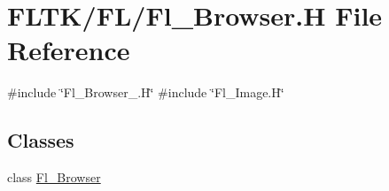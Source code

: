 \hypertarget{_fl___browser_8_h}{}\section{F\+L\+T\+K/\+F\+L/\+Fl\+\_\+\+Browser.H File Reference}
\label{_fl___browser_8_h}
{\ttfamily \#include \char`\"{}Fl\+\_\+\+Browser\+\_\+.\+H\char`\"{}}\newline
{\ttfamily \#include \char`\"{}Fl\+\_\+\+Image.\+H\char`\"{}}\newline
\subsection*{Classes}
\begin{DoxyCompactItemize}
\item 
class \hyperlink{class_fl___browser}{Fl\+\_\+\+Browser}
\end{DoxyCompactItemize}
